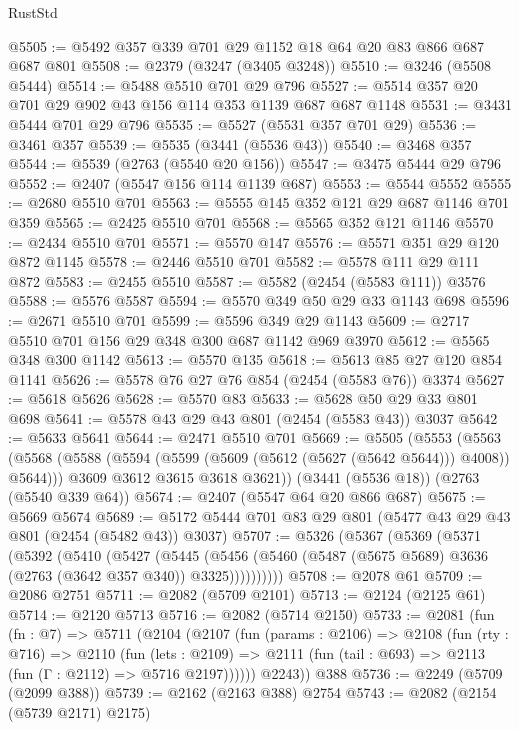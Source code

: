 \begin{lexlean}{RustStd}
\begin{coremodule}
@5505 := @5492 @357 @339 @701 @29 @1152 @18 @64 @20 @83 @866 @687 @687 @801
@5508 := @2379 (@3247 (@3405 @3248))
@5510 := @3246 (@5508 @5444)
@5514 := @5488 @5510 @701 @29 @796
@5527 := @5514 @357 @20 @701 @29 @902 @43 @156 @114 @353 @1139 @687 @687 @1148
@5531 := @3431 @5444 @701 @29 @796
@5535 := @5527 (@5531 @357 @701 @29)
@5536 := @3461 @357
@5539 := @5535 (@3441 (@5536 @43))
@5540 := @3468 @357
@5544 := @5539 (@2763 (@5540 @20 @156))
@5547 := @3475 @5444 @29 @796
@5552 := @2407 (@5547 @156 @114 @1139 @687)
@5553 := @5544 @5552
@5555 := @2680 @5510 @701
@5563 := @5555 @145 @352 @121 @29 @687 @1146 @701 @359
@5565 := @2425 @5510 @701
@5568 := @5565 @352 @121 @1146
@5570 := @2434 @5510 @701
@5571 := @5570 @147
@5576 := @5571 @351 @29 @120 @872 @1145
@5578 := @2446 @5510 @701
@5582 := @5578 @111 @29 @111 @872
@5583 := @2455 @5510
@5587 := @5582 (@2454 (@5583 @111)) @3576
@5588 := @5576 @5587
@5594 := @5570 @349 @50 @29 @33 @1143 @698
@5596 := @2671 @5510 @701
@5599 := @5596 @349 @29 @1143
@5609 := @2717 @5510 @701 @156 @29 @348 @300 @687 @1142 @969 @3970
@5612 := @5565 @348 @300 @1142
@5613 := @5570 @135
@5618 := @5613 @85 @27 @120 @854 @1141
@5626 := @5578 @76 @27 @76 @854 (@2454 (@5583 @76)) @3374
@5627 := @5618 @5626
@5628 := @5570 @83
@5633 := @5628 @50 @29 @33 @801 @698
@5641 := @5578 @43 @29 @43 @801 (@2454 (@5583 @43)) @3037
@5642 := @5633 @5641
@5644 := @2471 @5510 @701
@5669 := @5505
    (@5553
      (@5563
        (@5568 (@5588 (@5594 (@5599 (@5609 (@5612 (@5627 (@5642 @5644))) @4008)) @5644)))
        @3609
        @3612
        @3615
        @3618
        @3621))
    (@3441 (@5536 @18))
    (@2763 (@5540 @339 @64))
@5674 := @2407 (@5547 @64 @20 @866 @687)
@5675 := @5669 @5674
@5689 := @5172 @5444 @701 @83 @29 @801 (@5477 @43 @29 @43 @801 (@2454 (@5482 @43)) @3037)
@5707 := @5326
    (@5367
      (@5369
        (@5371
          (@5392
            (@5410
              (@5427
                (@5445
                  (@5456 (@5460 (@5487 (@5675 @5689) @3636 (@2763 (@3642 @357 @340)) @3325))))))))))
@5708 := @2078 @61
@5709 := @2086 @2751
@5711 := @2082 (@5709 @2101)
@5713 := @2124 (@2125 @61)
@5714 := @2120 @5713
@5716 := @2082 (@5714 @2150)
@5733 := @2081
    (fun (fn : @7) =>
    @5711
      (@2104
        (@2107
          (fun (params : @2106) =>
          @2108
            (fun (rty : @716) =>
            @2110
              (fun (lets : @2109) =>
              @2111 (fun (tail : @693) => @2113 (fun (Γ : @2112) => @5716 @2197))))))
        @2243))
    @388
@5736 := @2249 (@5709 (@2099 @388))
@5739 := @2162 (@2163 @388) @2754
@5743 := @2082 (@2154 (@5739 @2171) @2175)

\end{coremodule}
\end{lexlean}
